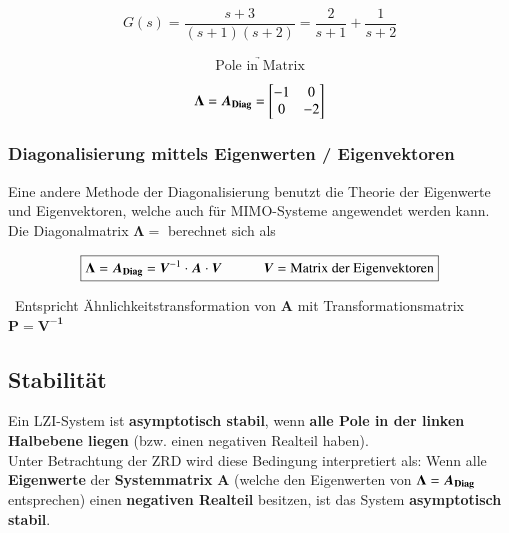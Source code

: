 \vspace{-0.3cm}

\begin{minipage}[b]{0.45\columnwidth}
    $$ G(s) =  \frac{s+3}{(s+1) (s+2)} = \frac{2}{s+1} + \frac{1}{s+2} $$
\end{minipage}
\hfill
\begin{minipage}[b]{0.18\columnwidth}
    $$ \underrightarrow{ \text{Pole in Matrix} } $$
\end{minipage}
\hfill
\begin{minipage}[c]{0.3\columnwidth}
    $$
    \bm{\Lambda} = \bm{A_{\rm Diag}} = 
    \begin{bmatrix}
        -1  & 0     \\
        0   & -2    \\
    \end{bmatrix}
    $$
\end{minipage}



\subsubsection{Diagonalisierung mittels Eigenwerten / Eigenvektoren}

Eine andere Methode der Diagonalisierung benutzt die Theorie der Eigenwerte und Eigenvektoren, welche auch für MIMO-Systeme angewendet werden kann.
Die Diagonalmatrix $\bm{\Lambda} = $ berechnet sich als

\vspace{-0.2cm}

$$ \boxed{ \bm{\Lambda} = \bm{A_{\rm Diag}} = \bm{V}^{-1} \cdot \bm{A} \cdot \bm{V} \qquad \quad \bm{V} = \text{Matrix der Eigenvektoren} } $$

\textrightarrow\ Entspricht Ähnlichkeitstransformation von $\bm{A}$ mit Transformationsmatrix $\bm{P} = \bm{V^{-1}}$


\subsection{Stabilität}
\label{Stabilität}

Ein LZI-System ist \textbf{asymptotisch stabil}, wenn \textbf{alle Pole in der linken Halbebene liegen} (bzw. einen negativen Realteil haben). \\
Unter Betrachtung der ZRD wird diese Bedingung interpretiert als:
Wenn alle \textbf{Eigenwerte} der \textbf{Systemmatrix} $\bm{A}$ (welche den Eigenwerten von $\bm{\Lambda} = \bm{A_{\rm Diag}}$ entsprechen)
einen \textbf{negativen Realteil} besitzen, ist das System \textbf{asymptotisch stabil}.

